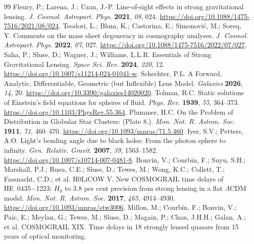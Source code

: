 \documentclass[galaxies,article,submit,oneauthor]{Definitions/mdpi}
\begin{document}
\begin{thebibliography}{99}
Fleury, P.; Larena, J.; Uzan, J.-P.
Line-of-sight effects in strong gravitational lensing.
\emph{J. Cosmol. Astropart. Phys.} \textbf{2021}, \emph{08}, 024.
\href{https://doi.org/10.1088/1475-7516/2021/08/024}{https://doi.org/10.1088/1475-7516/2021/08/024}.
Teodori, L.; Blum, K.; Castorina, E.; Simonovi\'c, M.; Soreq, Y.
Comments on the mass sheet degeneracy in cosmography analyses.
\emph{J. Cosmol. Astropart. Phys.} \textbf{2022}, \emph{07}, 027.
\href{https://doi.org/10.1088/1475-7516/2022/07/027}{https://doi.org/10.1088/1475-7516/2022/07/027}.
Saha, P.; Sluse, D.; Wagner, J.; Williams, L.L.R.
Essentials of Strong Gravitational Lensing.
\emph{Space Sci. Rev.} \textbf{2024}, \emph{220}, 12.
\href{https://doi.org/10.1007/s11214-024-01041-w}{https://doi.org/10.1007/s11214-024-01041-w}.
Schechter, P.L.
A Forward, Analytic, Differentiable, Geometric (but Inflexible) Lens Model.
\emph{Galaxies} \textbf{2026}, \emph{14}, 20.
\href{https://doi.org/10.3390/galaxies14020020}{https://doi.org/10.3390/galaxies14020020}.
Tolman, R.C. Static solutions of Einstein's field equations for spheres of fluid.
\emph{Phys. Rev.} \textbf{1939}, \emph{55}, 364--373.
\href{https://doi.org/10.1103/PhysRev.55.364}{https://doi.org/10.1103/PhysRev.55.364}.
Plummer, H.C.
On the Problem of Distribution in Globular Star Clusters: (Plate 8.).
\emph{Mon. Not. R. Astron. Soc.} \textbf{1911}, \emph{71}, 460--470.
\href{https://doi.org/10.1093/mnras/71.5.460}{https://doi.org/10.1093/mnras/71.5.460}.
Iyer, S.V.; Petters, A.O. Light's bending angle due to black holes:
From the photon sphere to infinity.
\emph{Gen. Relativ. Gravit.} \textbf{2007}, \emph{39}, 1563--1582.
\href{https://doi.org/10.1007/s10714-007-0481-8}{https://doi.org/10.1007/s10714-007-0481-8}.
Bonvin, V.; Courbin, F.; Suyu, S.H.; Marshall, P.J.; Rusu, C.E.;
Sluse, D.; Tewes, M.; Wong, K.C.; Collett, T.; Fassnacht, C.D.; et al.
H0LiCOW V. New COSMOGRAIL time delays of HE~0435$-$1223:
$H_0$ to 3.8 per cent precision from strong lensing in a flat
$\Lambda$CDM model.
\emph{Mon. Not. R. Astron. Soc.} \textbf{2017}, \emph{465}, 4914--4930.
\href{https://doi.org/10.1093/mnras/stw3006}{https://doi.org/10.1093/mnras/stw3006}.
Millon, M.; Courbin, F.; Bonvin, V.; Paic, E.; Meylan, G.; Tewes, M.;
Sluse, D.; Magain, P.; Chan, J.H.H.; Galan, A.; et al.
COSMOGRAIL XIX. Time delays in 18 strongly lensed quasars from 15 years
of optical monitoring.

\end{thebibliography}
\end{document}
